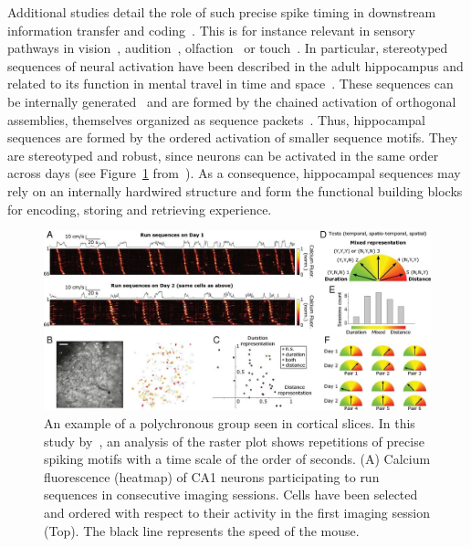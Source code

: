 \documentclass[brainsci, %
               review,submit,pdftex,moreauthors
               ]{Definitions/mdpi}
\begin{document}
Additional studies detail the role of such precise spike timing in downstream information transfer and coding~\citep{villette_internally_2015,branco_dendritic_2010,luczak_packet-based_2015}. This is for instance relevant in sensory pathways in vision~\citep{meister_concerted_1995}, audition~\citep{decharms_primary_1996}, olfaction~\citep{wehr_odour_1996} or touch~\citep{johansson_first_2004}.  In particular, stereotyped sequences of neural activation have been described in the adult hippocampus and related to its function in mental travel in time and space~\citep{buzsaki_space_2018}. These sequences can be internally generated~\citep{pastalkova_internally_2008,villette_internally_2015} and are formed by the chained activation of orthogonal assemblies, themselves organized as sequence packets~\citep{malvache_awake_2016}. Thus, hippocampal sequences are formed by the ordered activation of smaller sequence motifs. They are stereotyped and robust, since neurons can be activated in the same order across days (see Figure~\ref{fig:haimerl} from~\citep{haimerl_internal_2019}). As a consequence, hippocampal sequences may rely on an internally hardwired structure and form the functional building blocks for encoding, storing and retrieving experience.

%
\begin{figure}
\centering
\includegraphics[width=\linewidth]{figures/haimerl2019.jpg}
\caption{An example of a polychronous group seen in cortical slices. In this study by~\citep{haimerl_internal_2019}, an analysis of the raster plot shows repetitions of precise spiking motifs with a time scale of the order of seconds. (A) Calcium fluorescence (heatmap) of CA1 neurons participating to run sequences in consecutive imaging sessions. Cells have been selected and ordered with respect to their activity in the first imaging session (Top). The black line represents the speed of the mouse.}\label{fig:haimerl}
\end{figure}
\end{document}
